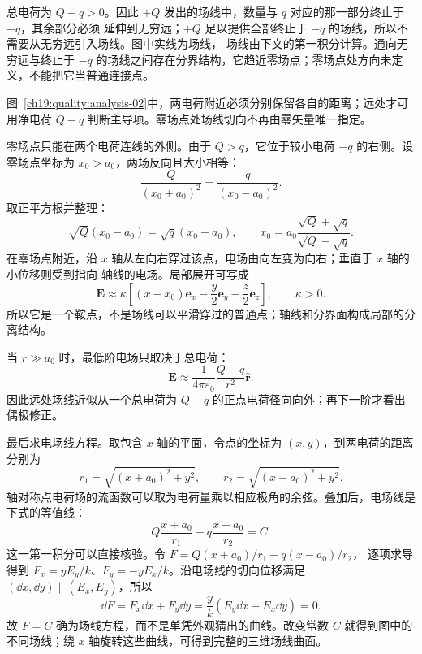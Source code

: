 \begin{xesolution}
总电荷为 $Q-q>0$。因此 $+Q$ 发出的场线中，数量与 $q$ 对应的那一部分终止于 $-q$，其余部分必须
延伸到无穷远；$+Q$ 足以提供全部终止于 $-q$ 的场线，所以不需要从无穷远引入场线。图中实线为场线，
场线由下文的第一积分计算。通向无穷远与终止于 $-q$ 的场线之间存在分界结构，它趋近零场点；零场点处方向未定义，不能把它当普通连接点。

\begin{qualityfigure}
\ThUnequalAnalysisDrawing
{}\label{ch19:quality:analysis-02}
\end{qualityfigure}
图~\ref{ch19:quality:analysis-02}中，两电荷附近必须分别保留各自的距离；远处才可用净电荷 $Q-q$ 判断主导项。零场点处场线切向不再由零矢量唯一指定。

零场点只能在两个电荷连线的外侧。由于 $Q>q$，它位于较小电荷 $-q$ 的右侧。设零场点坐标为
$x_0>a_0$，两场反向且大小相等：
\[
  \frac{Q}{(x_0+a_0)^2}=\frac{q}{(x_0-a_0)^2}.
\]
取正平方根并整理：
\[
  \sqrt Q(x_0-a_0)=\sqrt q(x_0+a_0),
  \qquad
  \boxed{x_0=a_0\frac{\sqrt Q+\sqrt q}{\sqrt Q-\sqrt q}}.
\]
在零场点附近，沿 $x$ 轴从左向右穿过该点，电场由向左变为向右；垂直于 $x$ 轴的小位移则受到指向
轴线的电场。局部展开可写成
\[
  \boldsymbol E\approx\kappa\left[(x-x_0)\boldsymbol e_x
  -\frac{y}{2}\boldsymbol e_y-\frac{z}{2}\boldsymbol e_z\right],\qquad\kappa>0.
\]
所以它是一个鞍点，不是场线可以平滑穿过的普通点；轴线和分界面构成局部的分离结构。

当 $r\gg a_0$ 时，最低阶电场只取决于总电荷：
\[
  \boxed{\boldsymbol E\approx\frac{1}{4\pi\varepsilon_0}
  \frac{Q-q}{r^2}\hat{\boldsymbol r}}.
\]
因此远处场线近似从一个总电荷为 $Q-q$ 的正点电荷径向向外；再下一阶才看出偶极修正。

最后求电场线方程。取包含 $x$ 轴的平面，令点的坐标为 $(x,y)$，到两电荷的距离分别为
\[
  r_1=\sqrt{(x+a_0)^2+y^2},\qquad r_2=\sqrt{(x-a_0)^2+y^2}.
\]
轴对称点电荷场的流函数可以取为电荷量乘以相应极角的余弦。叠加后，电场线是下式的等值线：
\[
  \boxed{Q\frac{x+a_0}{r_1}-q\frac{x-a_0}{r_2}=C}.
\]
这一第一积分可以直接核验。令 $F=Q(x+a_0)/r_1-q(x-a_0)/r_2$，
逐项求导得到 $F_x=yE_y/k$、$F_y=-yE_x/k$。沿电场线的切向位移满足
$(\dd x,\dd y)\parallel(E_x,E_y)$，所以
\[
 \dd F=F_x\dd x+F_y\dd y=\frac yk(E_y\dd x-E_x\dd y)=0.
\]
故 $F=C$ 确为场线方程，而不是单凭外观猜出的曲线。改变常数 $C$ 就得到图中的不同场线；绕 $x$ 轴旋转这些曲线，可得到完整的三维场线曲面。
\end{xesolution}











